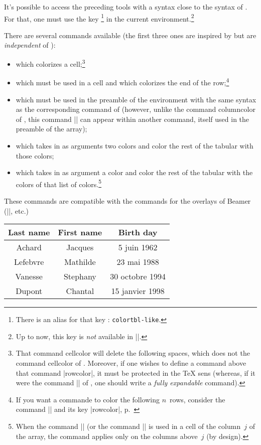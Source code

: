 \documentclass[dvipsnames]{article}%
\begin{document}
It's possible to access the preceding tools with a syntax close to the syntax
of . For that, one must use the key \footnote{There
  is an alias for that key : \texttt{colortbl-like}.} in the
current environment.\footnote{Up to now, this key is \emph{not} available in |\NiceMatrixOptions|.}

There are several commands available (the first three ones are inspired by
 but are \emph{independent} of ):
\begin{itemize}
\item {} which colorizes a cell;\footnote{That
  command cellcolor will delete the following spaces, which does not the
  command cellcolor of . Moreover, if one wishes to define a
  command above that command |rowcolor|, it must be protected in the TeX sens
  (whereas, if it were the command |\rowcolor| of , one should
  write a \emph{fully expandable} command).}
\item {} which must be used in a cell and which
colorizes the end of the row;\footnote{If you want a commande to color the
  following $n$~rows, consider the command |\RowStyle| and its key |rowcolor|,
  p.~\pageref{RowStyle}} 
\item {} which must be used in the preamble of the
environment with the same syntax as the corresponding command of 
(however, unlike the command columncolor of , this command
|\columncolor| can appear within another command, itself used in the preamble of
the array);
\item {} which takes in as arguments two colors and
color the rest of the tabular with those colors;
\item {} which takes in as argument a color and
color the rest of the tabular with the colors of that list of
colors.\footnote{When the command |\rowlistcolors| (or the command |\rowcolors|
  is used in a cell of the column~$j$ of the array, the command applies only on
  the columns above~$j$ (by design).}
\end{itemize}
These commands are compatible with the commands for the overlays of Beamer
(|\only|, etc.) 

\smallskip
\begin{Code}
\NewDocumentCommand { \Blue } { } { \emph{} }
\begin{NiceTabular}{>{\Blue}c>{\Blue}cc} 
\toprule
\emph{}
Last name & First name & Birth day \\
\midrule
Achard  & Jacques & 5 juin 1962 \\
Lefebvre & Mathilde & 23 mai 1988 \\
Vanesse & Stephany & 30 octobre 1994 \\
Dupont & Chantal & 15 janvier 1998 \\
\bottomrule
\end{NiceTabular}
\end{Code}
\end{document}
